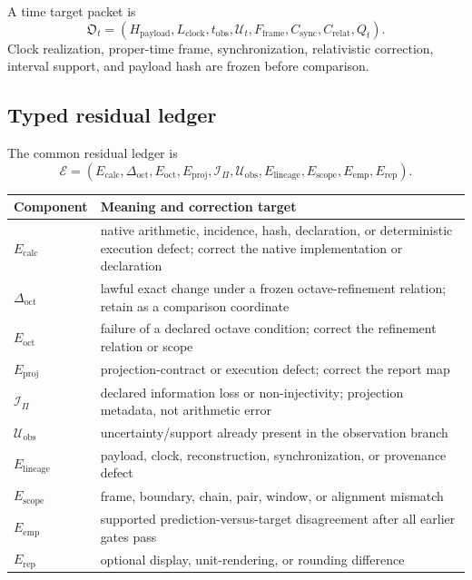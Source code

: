 A time target packet is
\[
\mathfrak O_t
=
(H_{\mathrm{payload}},L_{\mathrm{clock}},t_{\mathrm{obs}},\mathcal U_t,F_{\mathrm{frame}},C_{\mathrm{sync}},C_{\mathrm{relat}},Q_t).
\]
Clock realization, proper-time frame, synchronization, relativistic correction, interval support, and payload hash are frozen before comparison.

\subsection{Typed residual ledger}

The common residual ledger is
\[
\mathcal E
=
(E_{\mathrm{calc}},\Delta_{\mathrm{oct}},E_{\mathrm{oct}},E_{\mathrm{proj}},\mathcal I_{\Pi},\mathcal U_{\mathrm{obs}},E_{\mathrm{lineage}},E_{\mathrm{scope}},E_{\mathrm{emp}},E_{\mathrm{rep}}).
\]
\begin{center}
\begin{tabularx}{\linewidth}{@{}lX@{}}
\toprule
Component & Meaning and correction target \\
\midrule
$E_{\mathrm{calc}}$ & native arithmetic, incidence, hash, declaration, or deterministic execution defect; correct the native implementation or declaration \\
$\Delta_{\mathrm{oct}}$ & lawful exact change under a frozen octave-refinement relation; retain as a comparison coordinate \\
$E_{\mathrm{oct}}$ & failure of a declared octave condition; correct the refinement relation or scope \\
$E_{\mathrm{proj}}$ & projection-contract or execution defect; correct the report map \\
$\mathcal I_{\Pi}$ & declared information loss or non-injectivity; projection metadata, not arithmetic error \\
$\mathcal U_{\mathrm{obs}}$ & uncertainty/support already present in the observation branch \\
$E_{\mathrm{lineage}}$ & payload, clock, reconstruction, synchronization, or provenance defect \\
$E_{\mathrm{scope}}$ & frame, boundary, chain, pair, window, or alignment mismatch \\
$E_{\mathrm{emp}}$ & supported prediction-versus-target disagreement after all earlier gates pass \\
$E_{\mathrm{rep}}$ & optional display, unit-rendering, or rounding difference \\
\bottomrule
\end{tabularx}
\end{center}

